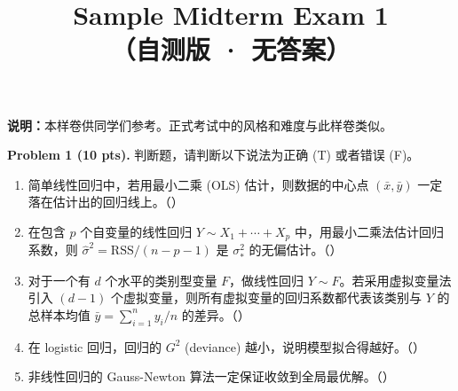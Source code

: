 \documentclass[11pt]{ctexart}
\title{\textbf{Sample Midterm Exam 1}\\[0.2em]
\large （自测版 · 无答案）}
\author{}
\date{}
\newcommand{\fillblank}{\mbox{（\qquad）}}
\begin{document}
\maketitle
\vspace{-1.2cm}

\noindent\textbf{说明：}本样卷供同学们参考。正式考试中的风格和难度与此样卷类似。

\vspace{0.6em}

\noindent\textbf{Problem 1 (10 pts).} 判断题，请判断以下说法为正确 (T) 或者错误 (F)。
\begin{enumerate}
\item 简单线性回归中，若用最小二乘 (OLS) 估计，则数据的中心点 $(\bar{x}, \bar{y})$ 一定落在估计出的回归线上。\fillblank
\item 在包含 $p$ 个自变量的线性回归 $Y \sim X_1 + \cdots + X_p$ 中，用最小二乘法估计回归系数，则 $\hat{\sigma}^2 = \mathrm{RSS}/(n-p-1)$ 是 $\sigma_*^2$ 的无偏估计。\fillblank
\item 对于一个有 $d$ 个水平的类别型变量 $F$，做线性回归 $Y \sim F$。若采用虚拟变量法引入 $(d-1)$ 个虚拟变量，则所有虚拟变量的回归系数都代表该类别与 $Y$ 的总样本均值 $\bar{y} = \sum_{i=1}^n y_i / n$ 的差异。\fillblank
\item 在 logistic 回归，回归的 $G^2$ (deviance) 越小，说明模型拟合得越好。\fillblank
\item 非线性回归的 Gauss-Newton 算法一定保证收敛到全局最优解。\fillblank
\end{enumerate}
\end{document}
